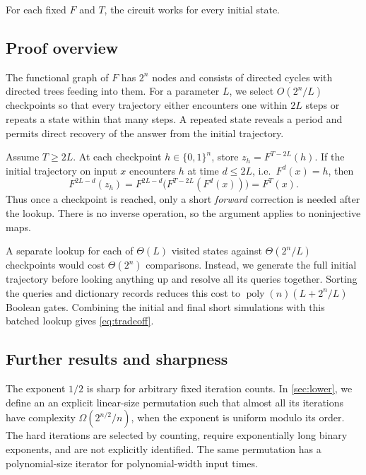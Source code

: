 \documentclass[11pt]{article}
\theoremstyle{definition}
\theoremstyle{remark}
\newcommand{\poly}{\operatorname{poly}}
\numberwithin{equation}{section}
\begin{document}
For each fixed $F$ and $T$, the circuit works for every initial state.

\subsection{Proof overview}

The functional graph of $F$ has $2^n$ nodes and consists of directed cycles with directed
trees feeding into them.  For a parameter $L$, we select $O(2^n/L)$
checkpoints so that every trajectory either encounters one within $2L$
steps or repeats a state within that many steps.  A repeated state reveals
a period and permits direct recovery of the answer from the initial
trajectory.

Assume $T\geq 2L$.  At each checkpoint $h\in\{0,1\}^n$, store
$z_h=F^{T-2L}(h)$.  If the initial trajectory on input $x$ encounters $h$ at time $d\leq 2L$,
i.e.\ $F^d(x) = h$, then
\begin{equation}\label{eq:overview-identity}
  F^{2L-d}(z_h)
  =F^{2L-d}\bigl(F^{T-2L}(F^d(x))\bigr)
  =F^T(x).
\end{equation}
Thus once a checkpoint is reached, only a short \emph{forward} correction is needed after the lookup.
There is no inverse operation, so the argument applies to noninjective
maps.

A separate lookup for each of $\Theta(L)$ visited states against
$\Theta(2^n/L)$ checkpoints would cost $\Theta(2^n)$ comparisons.  Instead,
we generate the full initial trajectory before looking anything up and
resolve all its queries together.  Sorting the queries and dictionary
records reduces this cost to
$\poly(n)(L+2^n/L)$ Boolean gates.  Combining the initial and final short
simulations with this batched lookup gives \cref{eq:tradeoff}.

\subsection{Further results and sharpness}

The exponent $1/2$ is sharp for arbitrary fixed iteration counts.  In
\cref{sec:lower}, we define an an explicit linear-size permutation such that
almost all its iterations have complexity $\Omega(2^{n/2}/n)$, when the exponent is uniform modulo its
order.  The hard iterations are selected by counting, require exponentially
long binary exponents, and are not explicitly identified.  The same
permutation has a polynomial-size iterator for polynomial-width input times.
\end{document}
